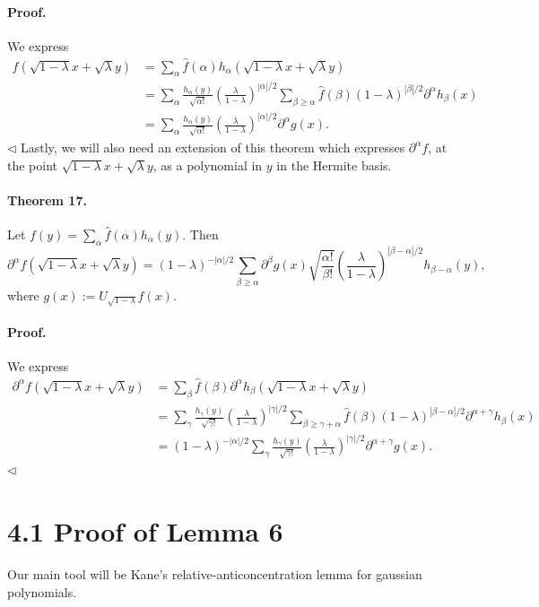 \paragraph{Proof.} We express
\begin{align*}
f(\sqrt{1-\lambda}x+\sqrt\lambda y)&=\sum_\alpha\widehat f(\alpha)h_\alpha(\sqrt{1-\lambda}x+\sqrt\lambda y)\\
&=\sum_\alpha\frac{h_\alpha(y)}{\sqrt{\alpha!}}\left(\frac\lambda{1-\lambda}\right)^{|\alpha|/2}\sum_{\beta\geq\alpha}\widehat f(\beta)(1-\lambda)^{|\beta|/2}\partial^\alpha h_\beta(x)\\
&=\sum_\alpha\frac{h_\alpha(y)}{\sqrt{\alpha!}}\left(\frac\lambda{1-\lambda}\right)^{|\alpha|/2}\partial^\alpha g(x).
\end{align*}\hfill$\triangleleft$
Lastly, we will also need an extension of this theorem which expresses $\partial^\alpha f$, at the point $\sqrt{1-\lambda}x+\sqrt\lambda y$, as a polynomial in $y$ in the Hermite basis.
\paragraph{Theorem 17.} Let $f(y)=\sum_\alpha\widehat f(\alpha)h_\alpha(y)$. Then
\[\partial^\alpha f(\sqrt{1-\lambda}x+\sqrt\lambda y)=(1-\lambda)^{-|\alpha|/2}\sum_{\beta\geq\alpha}\partial^\beta g(x)\sqrt{\frac{\alpha!}{\beta!}}\left(\frac\lambda{1-\lambda}\right)^{|\beta-\alpha|/2}h_{\beta-\alpha}(y),\]
where $g(x):=U_{\sqrt{1-\lambda}}f(x)$.
\paragraph{Proof.} We express
\begin{align*}
\partial^\alpha f(\sqrt{1-\lambda}x+\sqrt\lambda y)&=\sum_\beta\widehat f(\beta)\partial^\alpha h_\beta(\sqrt{1-\lambda}x+\sqrt\lambda y)\\
&=\sum_\gamma\frac{h_\gamma(y)}{\sqrt{\gamma!}}\left(\frac\lambda{1-\lambda}\right)^{|\gamma|/2}\sum_{\beta\geq\gamma+\alpha}\widehat f(\beta)(1-\lambda)^{|\beta-\alpha|/2}\partial^{\alpha+\gamma}h_\beta(x)\\
&=(1-\lambda)^{-|\alpha|/2}\sum_\gamma\frac{h_\gamma(y)}{\sqrt{\gamma!}}\left(\frac\lambda{1-\lambda}\right)^{|\gamma|/2}\partial^{\alpha+\gamma}g(x).
\end{align*}\hfill$\triangleleft$

\section*{4.1 Proof of Lemma 6}
Our main tool will be Kane's relative-anticoncentration lemma for gaussian polynomials.
